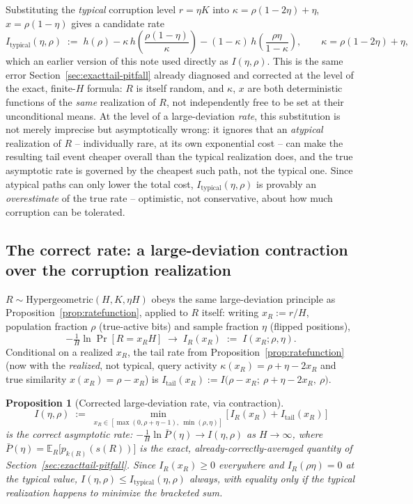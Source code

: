 \documentclass[11pt]{article}
\newtheorem{proposition}{Proposition}
\begin{document}
Substituting the \emph{typical} corruption level $r=\eta K$ into $\kappa=\rho(1-2\eta)+\eta$,
$x=\rho(1-\eta)$ gives a candidate rate
\begin{equation}
I_{\mathrm{typical}}(\eta,\rho) \;:=\; h(\rho) - \kappa\,h\!\left(\frac{\rho(1-\eta)}{\kappa}\right) - (1-\kappa)\,h\!\left(\frac{\rho\eta}{1-\kappa}\right), \qquad \kappa=\rho(1-2\eta)+\eta,
\label{eq:rate-typical}
\end{equation}
which an earlier version of this note used directly as $I(\eta,\rho)$. This is the same error
Section~\ref{sec:exacttail-pitfall} already diagnosed and corrected at the level of the exact,
finite-$H$ formula: $R$ is itself random, and $\kappa$, $x$ are both deterministic functions of
the \emph{same} realization of $R$, not independently free to be set at their unconditional means.
At the level of a large-deviation \emph{rate}, this substitution is not merely imprecise but
asymptotically wrong: it ignores that an \emph{atypical} realization of $R$ -- individually rare,
at its own exponential cost -- can make the resulting tail event cheaper overall than the typical
realization does, and the true asymptotic rate is governed by the cheapest such path, not the
typical one. Since atypical paths can only lower the total cost, $I_{\mathrm{typical}}(\eta,\rho)$
is provably an \emph{overestimate} of the true rate -- optimistic, not conservative, about how much
corruption can be tolerated.

\subsection{The correct rate: a large-deviation contraction over the corruption realization}
\label{sec:corrected-rate}

$R\sim\mathrm{Hypergeometric}(H,K,\eta H)$ obeys the same large-deviation principle as
Proposition~\ref{prop:ratefunction}, applied to $R$ itself: writing $x_R:=r/H$, population fraction
$\rho$ (true-active bits) and sample fraction $\eta$ (flipped positions),
\[
-\tfrac1H\ln\Pr[R=x_R H] \;\longrightarrow\; I_R(x_R) \;:=\; I(x_R;\rho,\eta).
\]
Conditional on a realized $x_R$, the tail rate from Proposition~\ref{prop:ratefunction} (now with
the \emph{realized}, not typical, query activity $\kappa(x_R)=\rho+\eta-2x_R$ and true similarity
$x(x_R)=\rho-x_R$) is $I_{\mathrm{tail}}(x_R) := I\big(\rho-x_R;\ \rho+\eta-2x_R,\ \rho\big)$.

\begin{proposition}[Corrected large-deviation rate, via contraction]
\label{prop:corrected-rate}
\[
I(\eta,\rho) \;:=\; \min_{x_R \in [\max(0,\rho+\eta-1),\ \min(\rho,\eta)]} \Big[\, I_R(x_R) + I_{\mathrm{tail}}(x_R) \,\Big]
\]
is the correct asymptotic rate: $-\tfrac1H\ln\bar P(\eta) \to I(\eta,\rho)$ as $H\to\infty$, where
$\bar P(\eta)=\mathbb{E}_R\big[p_{k(R)}(s(R))\big]$ is the exact, already-correctly-averaged
quantity of Section~\ref{sec:exacttail-pitfall}. Since $I_R(x_R)\ge0$ everywhere and
$I_R(\rho\eta)=0$ at the typical value, $I(\eta,\rho) \le I_{\mathrm{typical}}(\eta,\rho)$ always,
with equality only if the typical realization happens to minimize the bracketed sum.
\end{proposition}
\end{document}
